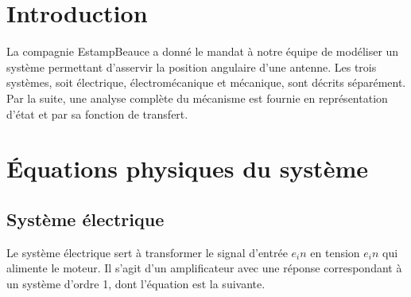 \documentclass{udes_rapport} %
\begin{document}




\newpage

\tableofcontents
\newpage


\listoffigures
\newpage



\setcounter{page}{1} %
\section{Introduction}
La compagnie EstampBeauce a donné le mandat à notre équipe de modéliser un système permettant d'asservir la 
position angulaire d'une antenne. Les trois systèmes, soit électrique, électromécanique et mécanique, sont décrits séparément. 
Par la suite, une analyse complète du mécanisme est fournie en représentation d'état et par sa fonction de transfert.

\section{Équations physiques du système}
\subsection{Système électrique}
Le système électrique sert à transformer le signal d'entrée $e_in$ en tension $e_in$ qui alimente le moteur.
Il s'agit d'un amplificateur avec une réponse correspondant à un système d'ordre 1, dont l'équation est la suivante.
\end{document}
